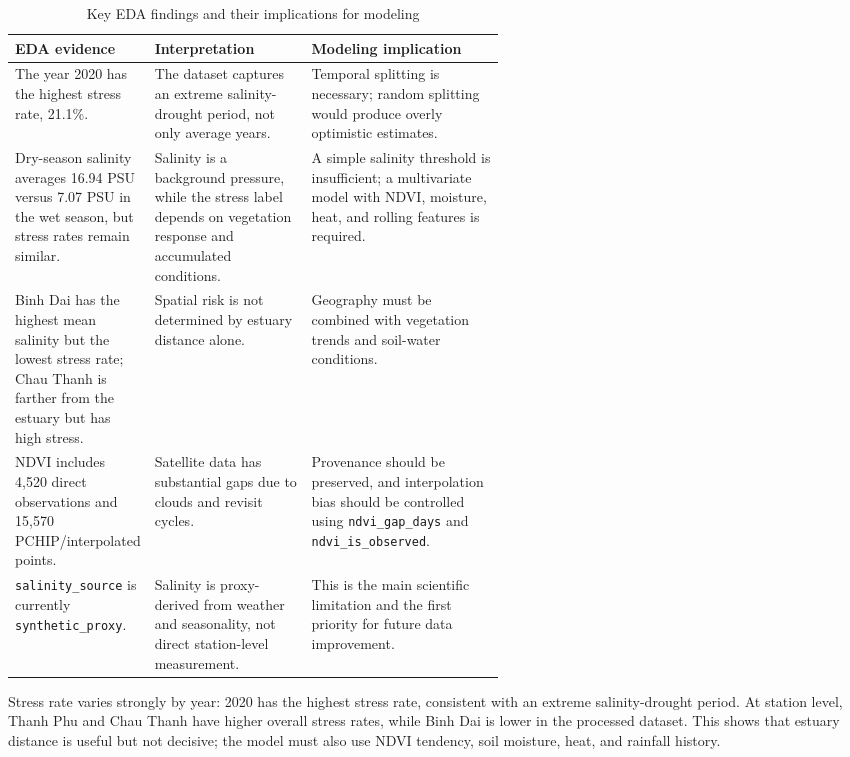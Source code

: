\documentclass[a4paper, 11pt]{article}
\begin{document}
\begin{table}[!htbp]
\centering
\caption{Key EDA findings and their implications for modeling}
\label{tab:eda-insights}
\footnotesize
\renewcommand{\arraystretch}{1.05}
\begin{tabularx}{0.98\linewidth}{>{\raggedright\arraybackslash}p{0.25\linewidth}>{\raggedright\arraybackslash}p{0.32\linewidth}>{\raggedright\arraybackslash}X}
\toprule
\textbf{EDA evidence} & \textbf{Interpretation} & \textbf{Modeling implication} \\
\midrule
The year 2020 has the highest stress rate, 21.1\%. & The dataset captures an extreme salinity-drought period, not only average years. & Temporal splitting is necessary; random splitting would produce overly optimistic estimates. \\
Dry-season salinity averages 16.94 PSU versus 7.07 PSU in the wet season, but stress rates remain similar. & Salinity is a background pressure, while the stress label depends on vegetation response and accumulated conditions. & A simple salinity threshold is insufficient; a multivariate model with NDVI, moisture, heat, and rolling features is required. \\
Binh Dai has the highest mean salinity but the lowest stress rate; Chau Thanh is farther from the estuary but has high stress. & Spatial risk is not determined by estuary distance alone. & Geography must be combined with vegetation trends and soil-water conditions. \\
NDVI includes 4,520 direct observations and 15,570 PCHIP/interpolated points. & Satellite data has substantial gaps due to clouds and revisit cycles. & Provenance should be preserved, and interpolation bias should be controlled using \texttt{ndvi\_gap\_days} and \texttt{ndvi\_is\_observed}. \\
\texttt{salinity\_source} is currently \texttt{synthetic\_proxy}. & Salinity is proxy-derived from weather and seasonality, not direct station-level measurement. & This is the main scientific limitation and the first priority for future data improvement. \\
\bottomrule
\end{tabularx}
\renewcommand{\arraystretch}{1.0}
\end{table}

Stress rate varies strongly by year: 2020 has the highest stress rate, consistent with an extreme salinity-drought period. At station level, Thanh Phu and Chau Thanh have higher overall stress rates, while Binh Dai is lower in the processed dataset. This shows that estuary distance is useful but not decisive; the model must also use NDVI tendency, soil moisture, heat, and rainfall history.
\end{document}

